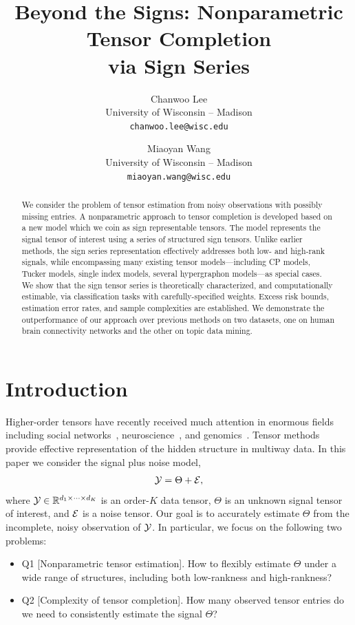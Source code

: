 \documentclass[11pt]{article}
\title{Beyond the Signs: Nonparametric Tensor Completion \\
via Sign Series}
\date{}
\author{%
Chanwoo Lee \\
University of Wisconsin -- Madison\\
\texttt{chanwoo.lee@wisc.edu} \\
\and
Miaoyan Wang \\
University of Wisconsin -- Madison\\
\texttt{miaoyan.wang@wisc.edu} \\
}
\theoremstyle{plain}
\theoremstyle{definition}
\begin{document}
\maketitle

\begin{abstract}
We consider the problem of tensor estimation from noisy observations with possibly missing entries. A nonparametric approach to tensor completion is developed based on a new model which we coin as sign representable tensors. The model represents the signal tensor of interest using a series of structured sign tensors. Unlike earlier methods, the sign series representation effectively addresses both low- and high-rank signals, while encompassing many existing tensor models---including CP models, Tucker models, single index models, several hypergraphon models---as special cases. We show that the sign tensor series is theoretically characterized, and computationally estimable, via classification tasks with carefully-specified weights. Excess risk bounds, estimation error rates, and sample complexities are established. We demonstrate the outperformance of our approach over previous methods on two datasets, one on human brain connectivity networks and the other on topic data mining. 
\end{abstract}

\section{Introduction}\label{sec:intro}

Higher-order tensors have recently received much attention in enormous fields including social networks~\citep{anandkumar2014tensor}, neuroscience~\citep{wang2017bayesian}, and genomics~\citep{hore2016tensor}. Tensor methods provide effective representation of the hidden structure in multiway data. In this paper we consider the signal plus noise model,
\begin{equation}\label{eq:modelintro}
\mathcal{Y}=\Theta+\mathcal{E},
\end{equation}
where $\mathcal{Y}\in\mathbb{R}^{d_1\times \cdots \times d_K}$ is an order-$K$ data tensor, $\Theta$ is an unknown signal tensor of interest, and $\mathcal{E}$ is a noise tensor. Our goal is to accurately estimate $\Theta$ from the incomplete, noisy observation of $\mathcal{Y}$. In particular, we focus on the following two problems:
\begin{itemize}[leftmargin=*]
\item Q1 [Nonparametric tensor estimation]. How to flexibly estimate $\Theta$ under a wide range of structures, including both low-rankness and high-rankness?
\item Q2 [Complexity of tensor completion]. How many observed tensor entries do we need to consistently estimate the signal $\Theta$?
\end{itemize}
\end{document}
